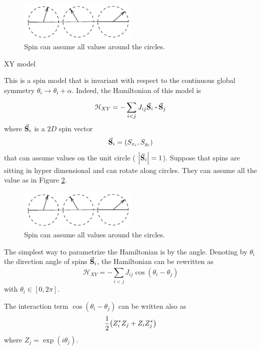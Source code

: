 \documentclass[../../Main/Main.tex]{subfiles}
\begin{document}
\begin{figure}[H]
\centering
\includegraphics[width=0.5\textwidth]{./img/2.pdf}
\caption{\label{fig:10_2} Spin can assume all values around the circles.}
\end{figure}

\begin{example}{XY model}{}


This is a spin model that is invariant with respect to the continuous global symmetry
\( \theta _i \rightarrow \theta _i + \alpha  \).
Indeed, the Hamiltonian of this model is
\begin{equation}
  \mathcal{H}_{XY} = - \sum_{i<j}^{} J_{ij} \va{S}_i \vdot \va{S}_j
\end{equation}
where \(\va{S}_i  \) is a \( 2D \) spin vector
\begin{equation*}
  \va{S}_i = (S_{x_i}, S_{y_i})
\end{equation*}
that can assume values on the unit circle ( \(  \abs{\va{S}_i} =1 \)).
Suppose that spins are sitting in hyper dimensional and can rotate along circles. They can assume all the value as in Figure \ref{fig:10_2}.
\begin{figure}[H]
\centering
\includegraphics[width=0.5\textwidth]{./img/2.pdf}
\caption{\label{fig:10_2} Spin can assume all values around the circles.}
\end{figure}
The simplest way to parametrize the Hamiltonian is by the angle.
Denoting by \( \theta _i \) the direction angle of spins \( \va{S}_i \), the Hamiltonian can be rewritten as
\begin{equation}
  \mathcal{H}_{XY} = - \sum_{i<j}^{} J_{ij} \cos(\theta _i - \theta _j)
\end{equation}
with \( \theta _i \in [0,2 \pi ] \).

\begin{remark}
The interaction term \( \cos(\theta _i - \theta _j)  \) can be written also as
\begin{equation*}
  \frac{1}{2} \qty(Z_i^* Z_j + Z_i Z_j^*)
\end{equation*}
where \(   Z_j = \exp (i \theta _j) \).
\end{remark}


\end{example}
\end{document}
